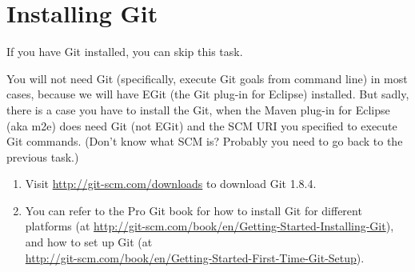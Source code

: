
\section{Installing Git}

If you have Git installed, you can skip this task.

You will not need Git (specifically, execute Git goals from command line) in
most cases, because we will have EGit (the Git plug-in for Eclipse) installed.
But sadly, there is a case you have to install the Git, when the Maven plug-in
for Eclipse (aka m2e) does need Git (not EGit) and the SCM URI you specified to
execute Git commands. (Don't know what SCM is? Probably you need to go back to
the previous task.)

\begin{enumerate}

\item Visit \url{http://git-scm.com/downloads} to download Git 1.8.4.

\item You can refer to the Pro Git book for how to install Git for different
platforms (at \url{http://git-scm.com/book/en/Getting-Started-Installing-Git}),
and how to set up Git (at
\\\url{http://git-scm.com/book/en/Getting-Started-First-Time-Git-Setup}).

\end{enumerate}
